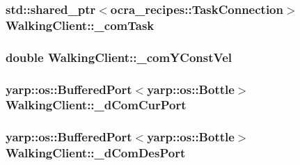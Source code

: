 \hypertarget{classWalkingClient_aa798d6193535e80816f8107ee5fb2172}{
\subsubsection[{\-\_\-com\-Task}]{\setlength{\rightskip}{0pt plus 5cm}std\-::shared\-\_\-ptr$<$ocra\-\_\-recipes\-::\-Task\-Connection$>$ {\bf \-Walking\-Client\-::\-\_\-com\-Task}}}\label{classWalkingClient_aa798d6193535e80816f8107ee5fb2172}
\hypertarget{classWalkingClient_a4e448bc147b41d97e0f17af6ebb0020f}{
\subsubsection[{\-\_\-com\-Y\-Const\-Vel}]{\setlength{\rightskip}{0pt plus 5cm}double {\bf \-Walking\-Client\-::\-\_\-com\-Y\-Const\-Vel}}}\label{classWalkingClient_a4e448bc147b41d97e0f17af6ebb0020f}
\hypertarget{classWalkingClient_a1fbc9d7f1e967f24acda745028f865df}{
\subsubsection[{\-\_\-d\-Com\-Cur\-Port}]{\setlength{\rightskip}{0pt plus 5cm}yarp\-::os\-::\-Buffered\-Port$<$yarp\-::os\-::\-Bottle$>$ {\bf \-Walking\-Client\-::\-\_\-d\-Com\-Cur\-Port}}}\label{classWalkingClient_a1fbc9d7f1e967f24acda745028f865df}
\hypertarget{classWalkingClient_a17369473b4fe2ff0eaecc7d41a8430c7}{
\subsubsection[{\-\_\-d\-Com\-Des\-Port}]{\setlength{\rightskip}{0pt plus 5cm}yarp\-::os\-::\-Buffered\-Port$<$yarp\-::os\-::\-Bottle$>$ {\bf \-Walking\-Client\-::\-\_\-d\-Com\-Des\-Port}}}\label{classWalkingClient_a17369473b4fe2ff0eaecc7d41a8430c7}
